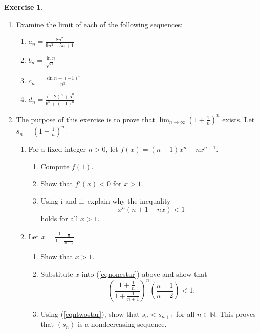 \documentclass[12pt,letterpaper]{book}
\numberwithin{equation}{section}
\theoremstyle{definition}
\newtheorem{exercise}{\textbf{Exercise}}[chapter]
\begin{document}
\begin{exercise} \quad
\begin{enumerate}[\bfseries 1.]

\item Examine the limit of each of the following sequences:
\begin{multicols}{2}
\begin{enumerate}
\item $a_n=\frac{8n^2}{9n^2-5n+1}$
\item $b_n=\frac{\ln n}{\sqrt{n}}$
\item $c_n=\frac{\sin n + (-1)^n}{n^3}$
\item $d_n=\frac{(-2)^n+5^{n}}{6^n+(-1)^n}$
\end{enumerate}
\end{multicols}

\item The purpose of this exercise is to prove that $\displaystyle{\lim_{n\to \infty}\left(1+\frac{1}{n}\right)^n}$ exists. Let $\displaystyle{s_n=\left(1+\frac{1}{n}\right)^n}$.

\begin{enumerate}
\item For a fixed integer $n>0$, let $f(x)=(n+1)x^n-nx^{n+1}$.
\begin{enumerate}
\item Compute $f(1)$.
\item Show that $f'(x)< 0$ for $x>1$.
\item Using i and ii, explain why the inequality
\begin{equation}\label{eqnonestar} x^n(n+1-nx)<1  \end{equation} holds for all $x>1$.
\end{enumerate}

\item Let $\displaystyle{x=\frac{1+\frac{1}{n}}{1+\frac{1}{n+1}}}$.
\begin{enumerate}
\item Show that $x>1$.
\item Substitute $x$ into (\ref{eqnonestar}) above and show that
\begin{equation}\label{eqntwostar}\left(\frac{1+\frac{1}{n}}{1+\frac{1}{n+1}}\right)^n\left(\frac{n+1}{n+2}\right)<1. \end{equation}
\item Using (\ref{eqntwostar}), show that $s_n<s_{n+1}$ for all $n\in \mathbb{N}$. This proves that $(s_n)$ is a nondecreasing sequence.
\end{enumerate}


\end{enumerate}
\end{enumerate}
\end{exercise}
\end{document}

